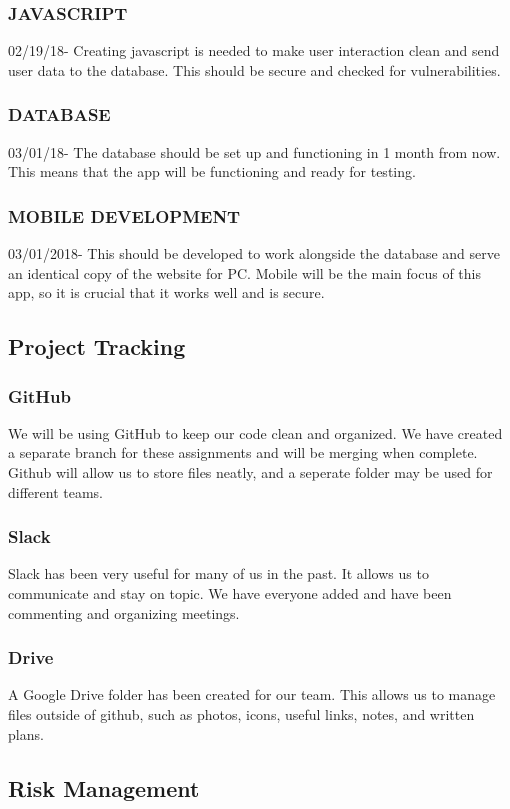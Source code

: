 \documentclass[12pt]{article}
\begin{document}
\subsubsection{JAVASCRIPT}
	02/19/18- Creating javascript is needed to make user interaction clean and send user data to the 	database. This should be secure and checked for vulnerabilities.
\subsubsection{DATABASE}
	03/01/18- The database should be set up and functioning in 1 month from now. This means that 	the app will be functioning and ready for testing.
\subsubsection{MOBILE DEVELOPMENT}
	03/01/2018- This should be developed to work alongside the database and serve an identical 	copy of the website for PC. Mobile will be the main focus of this app, so it is crucial that it 	works well and is secure.

\subsection{Project Tracking}
\subsubsection{GitHub}
	We will be using GitHub to keep our code clean and organized. We have created a separate branch for these assignments and will be merging when complete. Github will allow us to store files neatly, and a seperate folder may be used for different teams.
\subsubsection{Slack}
	Slack has been very useful for many of us in the past. It allows us to communicate and stay on topic. We have everyone added and have been commenting and organizing meetings.
\subsubsection{Drive}
	A Google Drive folder has been created for our team. This allows us to manage files outside of github, such as photos, icons, useful links, notes, and written plans.

\subsection{Risk Management}
\end{document}
